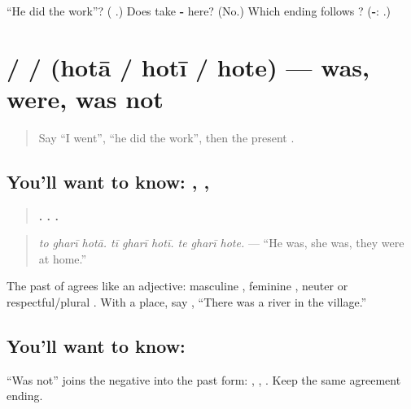 \begin{tcolorbox}[breakable,colback=teal!4,colframe=teal!35!black,title={Before you move on}]
\textquotedblleft{}He did the work\textquotedblright{}? (\textbf{  }.) Does \textbf{} take \textbf{-} here? (No.) Which ending follows \textbf{}? (\textbf{-}: \textbf{}.)
\end{tcolorbox}
\section[\texorpdfstring{\mr{होता} / \mr{होती} / \mr{होते} (hotā / hotī / hote)}{होता / होती / होते (hotā / hotī / hote)}]{ /  /  (hotā / hotī / hote) — was, were, was not}

\label{lesson:MR-C159-hota}



\begin{quote}
Say \textquotedblleft{}I went\textquotedblright{}, \textquotedblleft{}he did the work\textquotedblright{}, then the present \textbf{}.
\end{quote}

\subsection*{You'll want to know: , , }
\begin{quote}
\textbf{  .   .   .}
\end{quote}

\begin{quote}
\emph{to gharī hotā. tī gharī hotī. te gharī hote.} — \textquotedblleft{}He was, she was, they were at home.\textquotedblright{}
\end{quote}

The past of \textbf{} agrees like an adjective: masculine \textbf{}, feminine \textbf{}, neuter or respectful/plural \textbf{}. With a place, say \textbf{   }, \textquotedblleft{}There was a river in the village.\textquotedblright{}

\subsection*{You'll want to know: }
\textquotedblleft{}Was not\textquotedblright{} joins the negative into the past form: \textbf{  }, \textbf{  }, \textbf{  }. Keep the same agreement ending.

